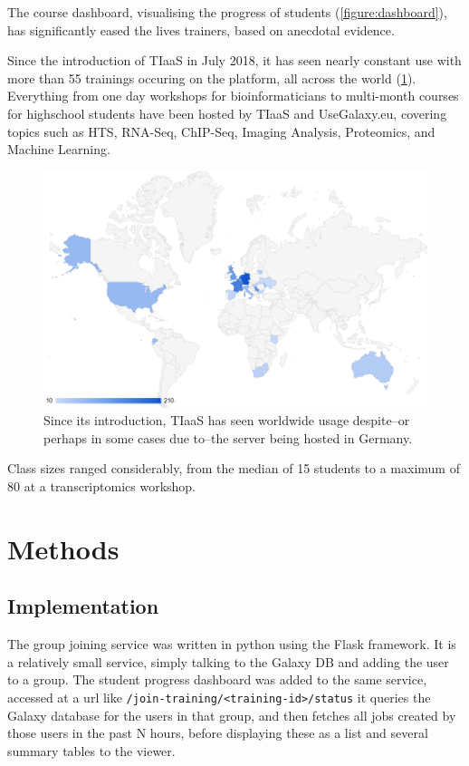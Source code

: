\documentclass[a4paper,num-refs]{oup-contemporary}
\begin{document}
The course dashboard, visualising the progress of students (\ref{figure:dashboard}), has significantly eased the lives trainers, based on anecdotal evidence.

Since the introduction of TIaaS in July 2018, it has seen nearly constant use with more than 55 trainings occuring on the platform, all across the world (\ref{figure:map}). Everything from one day workshops for bioinformaticians to multi-month courses for highschool students have been hosted by TIaaS and UseGalaxy.eu, covering topics such as HTS, RNA-Seq, ChIP-Seq, Imaging Analysis, Proteomics, and Machine Learning.

\begin{figure}[bt!]
\centering
\includegraphics[width=\linewidth]{images/map.png}
	\caption{Since its introduction, TIaaS has seen worldwide usage despite--or perhaps in some cases due to--the server being hosted in Germany.}\label{figure:map}
\end{figure}

Class sizes ranged considerably, from the median of 15 students to a maximum of 80 at a transcriptomics workshop.


\section{Methods}

\subsection{Implementation}
The group joining service was written in python using the Flask framework. It is a relatively small service, simply talking to the Galaxy DB and adding the user to a group.
The student progress dashboard was added to the same service, accessed at a url like \texttt{/join-training/<training-id>/status} it queries the Galaxy database for the users in that group, and then fetches all jobs created by those users in the past N hours, before displaying these as a list and several summary tables to the viewer.
\end{document}
